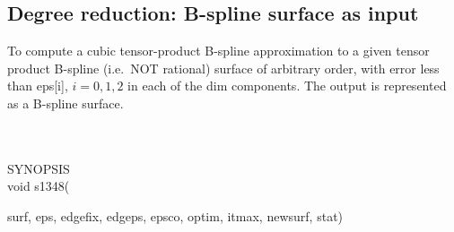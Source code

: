 \subsection{Degree reduction: B-spline surface as input}
\begin{minipg1}
  To compute a cubic tensor-product B-spline approximation to a given tensor
  product B-spline (i.e.\ NOT rational) surface of arbitrary order, with
  error less than {\fov eps}[i], $i=0,1,2$ in each of the {\fov dim} components.
  The output is represented as a B-spline surface.
\end{minipg1} \\ \\
SYNOPSIS\\
        \>void s1348(\begin{minipg3}
                {\fov surf}, {\fov eps}, {\fov edgefix}, {\fov edgeps}, {\fov epsco}, {\fov optim}, {\fov itmax}, {\fov newsurf}, {\fov stat})
                \end{minipg3}\\[0.3ex]

